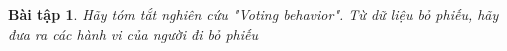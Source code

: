 \documentclass[14pt, a4paper]{article}
\theoremstyle{sltheorem}
\newtheorem{baitap}{Bài tập}
\theoremstyle{soltheorem}
\begin{document}
\begin{titlepage}





    \vfill %

\end{titlepage}

\nocite{*}

\newpage
\begin{baitap}
    Hãy tóm tắt nghiên cứu "Voting behavior".
    Từ dữ liệu bỏ phiếu, hãy đưa ra các hành vi của người đi bỏ phiếu
\end{baitap}
\end{document}
